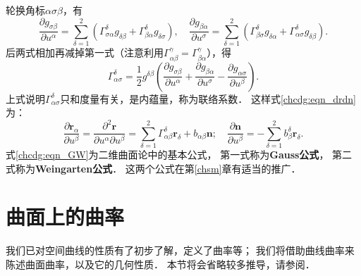 轮换角标$\alpha\sigma \beta$，有
\begin{equation}
    \frac{\partial g_{\sigma\beta}}{\partial u^\alpha} =   \sum_{\delta=1}^{2} 
    \left(\Gamma_{\sigma\alpha}^\delta g_{\delta \beta} + \Gamma_{\beta\alpha}^\delta g_{\delta \sigma} \right) , \quad
    \frac{\partial g_{\beta\alpha}}{\partial u^\sigma} =   \sum_{\delta=1}^{2} 
    \left(\Gamma_{\beta \sigma}^\delta g_{\delta \alpha} + \Gamma_{\alpha \sigma}^\delta g_{\delta \beta} \right) .
\end{equation}
后两式相加再减掉第一式（注意利用$\Gamma^\gamma_{\alpha \beta}=\Gamma^\gamma_{\beta\alpha}$），得
\begin{equation}\label{chcdg:eqn_Christoffel}
    \Gamma_{\alpha\sigma}^\delta = \frac{1}{2} g^{\delta \beta}\left(\frac{\partial g_{\sigma\beta}}{\partial u^\alpha}
    +\frac{\partial g_{\beta\alpha}}{\partial u^\sigma}-\frac{\partial g_{\alpha \sigma}}{\partial u^\beta} \right) .
\end{equation}
上式说明$\Gamma_{\alpha \sigma}^\delta$只和度量有关，是内蕴量，称为{\heiti 联络系数}．
这样式\eqref{chcdg:eqn_drdn}为：
\begin{equation}\label{chcdg:eqn_GW}
    \frac{\partial \boldsymbol{r}_\alpha}{\partial u^\beta} 
    =\frac{\partial^2 \boldsymbol{r}}{\partial u^\alpha\partial u^\beta}
    = \sum_{\delta=1}^{2}\Gamma_{\alpha \beta}^\delta 
    \boldsymbol{r}_\delta + b_{\alpha \beta} \boldsymbol{n};\quad
    \frac{\partial \boldsymbol{n}}{\partial u^\beta} = 
    -\sum_{\delta=1}^{2} b_{\beta}^\delta \boldsymbol{r}_\delta .
\end{equation}
式\eqref{chcdg:eqn_GW}为二维曲面论中的{\heiti 基本公式}，
第一式称为{\bfseries \heiti Gauss公式}，
第二式称为{\bfseries \heiti Weingarten公式}．
这两个公式在第\ref{chsm}章有适当的推广．






\section{曲面上的曲率}
我们已对空间曲线的性质有了初步了解，定义了曲率等；
我们将借助曲线曲率来陈述曲面曲率，以及它的几何性质．
本节将会省略较多推导，请参阅\parencite[\S 2.4]{subq-2016}．

